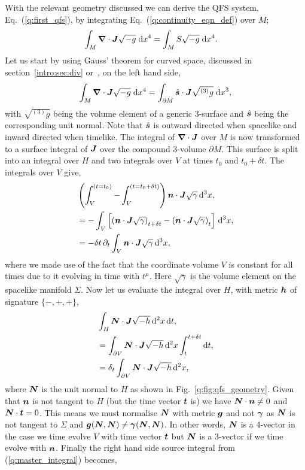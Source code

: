 With the relevant geometry discussed we can derive the QFS system, Eq.~(\ref{q:first_qfs}), by integrating Eq.~(\ref{q:continuity_eqn_def}) over $M$;
\begin{align} \label{q:master_integral}
\int_{M } \boldsymbol{\nabla}\cdot \boldsymbol{J} \sqrt{-g} \;\dd x^4 &= \int_{M } S \sqrt{-g} \;\dd x^4.
\end{align}
Let us start by using Gauss' theorem for curved space, discussed in section~\ref{intro:sec:div} or~\cite{baumgarte_shapiro_2010}, on the left hand side, 
\begin{align} \label{q:master_gauss}
\int_{M } \boldsymbol{\nabla}\cdot \boldsymbol{J} \sqrt{-g}\;\dd x^4  = \int_{\partial M } \hat{\boldsymbol{s}} \cdot \boldsymbol{J} \sqrt{{}^{(3)}{g}} \;\dd x^3 ,
\end{align}
with $\sqrt{{}^{(3)}g}$ being the volume element of a generic 3-surface and $\hat{\boldsymbol{s}}$ being the corresponding unit normal. Note that $\hat{\boldsymbol s}$ is outward directed when spacelike and inward directed when timelike. The integral of  $\boldsymbol{\nabla} \cdot \boldsymbol{J}$ over $M$ is now transformed to a surface integral of $\boldsymbol{J}$ over the compound 3-volume $\partial M$. This surface is split into an integral over $H$ and two integrals over $V$ at times $t_0$ and $t_0 + \delta t$. The integrals over $V$ give,
\begin{align}
&\left(\int^{(t=t_0)}_{V} - \int^{(t=t_0+\delta t)}_{V} \right)\boldsymbol{n} \cdot \boldsymbol{J} \sqrt{\gamma} \,\dd^3 x ,\nonumber \\
&=-\int_{V}\left[\left(\boldsymbol{n} \cdot \boldsymbol{J} \sqrt{\gamma}\right)_{t+\delta t} - \left(\boldsymbol{n} \cdot \boldsymbol{J} \sqrt{\gamma}\right)_{t}\right] \,\dd^3 x, \\
\label{q:q_int}&=-\delta t\,\partial_t \int_{V} \boldsymbol{n} \cdot \boldsymbol{J} \sqrt{\gamma}\,\dd^3 x ,
\end{align} 
where we made use of the fact that the coordinate volume $V$ is constant for all times due to it evolving in time with $t^\mu$. Here $\sqrt{\gamma}$ is the volume element on the spacelike manifold $\Sigma$. Now let us evaluate the integral over $H$, with metric $\boldsymbol{h}$ of signature $\{-,+,+\}$,
\begin{align} 
&\int_{H} \boldsymbol{N} \cdot \boldsymbol{J} \sqrt{-h} \,\dd^2 x\,\dd t, \nonumber \\
&=\int_{\partial V}  \boldsymbol{N} \cdot \boldsymbol{J} \sqrt{-h} \,\dd^2 x\int_t^{t+\delta t}\dd t, \\
\label{q:f_int}&=\delta_t \int_{\partial V} \boldsymbol{N} \cdot \boldsymbol{J} \sqrt{-h} \,\dd^2 x,
\end{align}
where $\boldsymbol{N}$ is the unit normal to $H$ as shown in Fig.~\ref{q:fig:qfs_geometry}. Given that $\boldsymbol{n}$ is not tangent to $H$ (but the time vector $\boldsymbol{t}$ is) we have $\boldsymbol{N} \cdot \boldsymbol{n} \neq 0$ and $\boldsymbol{N} \cdot \boldsymbol{t} =0$. This means we must normalise $\boldsymbol{N}$ with metric $\boldsymbol{g}$ and not $\boldsymbol{\gamma}$ as $\boldsymbol{N}$ is not tangent to $\Sigma$ and $\boldsymbol{g}(\boldsymbol{N},\boldsymbol{N})\neq \boldsymbol{\gamma}(\boldsymbol{N},\boldsymbol{N})$. In other words, $\boldsymbol{N}$ is a 4-vector in the case we time evolve $V$ with time vector $\boldsymbol{t}$ but $\boldsymbol{N}$ is a 3-vector if we time evolve with $\boldsymbol{n}$. Finally the right hand side source integral from (\ref{q:master_integral}) becomes,
